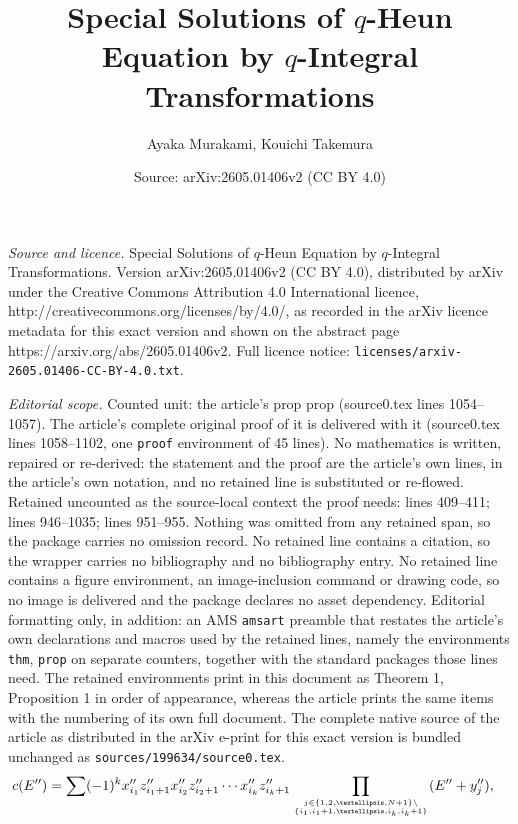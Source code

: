 \documentclass[10pt,a4paper]{amsart}
\title{Special Solutions of $q$-Heun Equation by $q$-Integral Transformations}
\author{Ayaka Murakami, Kouichi Takemura}
\date{Source: arXiv:2605.01406v2 (CC BY 4.0)}
\begin{document}
\maketitle

\noindent\emph{Source and licence.} Special Solutions of $q$-Heun Equation by $q$-Integral Transformations. Version arXiv:2605.01406v2 (CC BY 4.0), distributed by arXiv under the Creative Commons Attribution 4.0 International licence, http://creativecommons.org/licenses/by/4.0/, as recorded in the arXiv licence metadata for this exact version and shown on the abstract page https://arxiv.org/abs/2605.01406v2. Full licence notice: \texttt{licenses/arxiv-2605.01406-CC-BY-4.0.txt}.\par\smallskip

\noindent\textit{Editorial scope.} Counted unit: the article's prop prop (source0.tex lines 1054--1057). The article's complete original proof of it is delivered with it (source0.tex lines 1058--1102, one \texttt{proof} environment of 45 lines). No mathematics is written, repaired or re-derived: the statement and the proof are the article's own lines, in the article's own notation, and no retained line is substituted or re-flowed.  Retained uncounted as the source-local context the proof needs: lines 409--411; lines 946--1035; lines 951--955.  Nothing was omitted from any retained span, so the package carries no omission record.  No retained line contains a citation, so the wrapper carries no bibliography and no bibliography entry.  No retained line contains a figure environment, an image-inclusion command or drawing code, so no image is delivered and the package declares no asset dependency.  Editorial formatting only, in addition: an AMS \texttt{amsart} preamble that restates the article's own declarations and macros used by the retained lines, namely the environments \texttt{thm}, \texttt{prop} on separate counters, together with the standard packages those lines need.  The retained environments print in this document as Theorem 1, Proposition 1 in order of appearance, whereas the article prints the same items with the numbering of its own full document.  The complete native source of the article as distributed in the arXiv e-print for this exact version is bundled unchanged as \texttt{sources/199634/source0.tex}.
\begin{align}
 & c (E'') = \sum (-1) ^k x''_{i_1} z'' _{i_1 +1 } x''_{i_2} z'' _{i_2 +1 } \cdots x''_{i_k} z'' _{i_k +1 }  \prod _{j \in \{ 1,2, \dots ,N +1 \} \setminus \atop{\{ i_1 , i_1 +1 , \dots , i_k , i_k +1  \} }} (E'' + y''_j ) , \label{eq:cE''sum}
\end{align}
\end{document}
